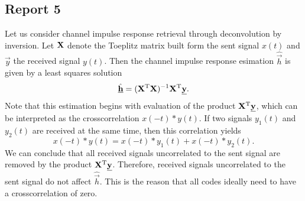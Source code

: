 \documentclass[11pt,titlepage]{report}
\begin{document}
\subsection{Report 5}
Let us consider channel impulse response retrieval through deconvolution by inversion. Let $\mathbf{X}$ denote the Toeplitz matrix built form the sent signal $x(t)$ and $\vec{y}$ the received signal $y(t)$. Then the channel impulse response esimation $\hat{\vec{h}}$ is given by a least squares solution
\[
	\hat{\mathbf{\underline{h}}} = (\mathbf{X}^{\text T} \mathbf{X})^{-1} \mathbf{X}^{\text T} \mathbf{\underline{y}}.
\]
Note that this estimation begins with evaluation of the product $\mathbf{X}^{\text T} \mathbf{\underline{y}}$, which can be interpreted as the crosscorrelation $x(-t) \ast y(t)$. If two signals $y_1(t)$ and $y_2(t)$ are received at the same time, then this correlation yields
\[
	x(-t) \ast y(t) = x(-t) \ast y_1(t) + x(-t) \ast y_2(t).
\]
We can conclude that all received signals uncorrelated to the sent signal are removed by the product $\mathbf{X}^{\text T} \mathbf{\underline{y}}$. Therefore, received signals uncorrelated to the sent signal do not affect $\hat{\vec{h}}$. This is the reason that all codes ideally need to have a crosscorrelation of zero.
\end{document}
